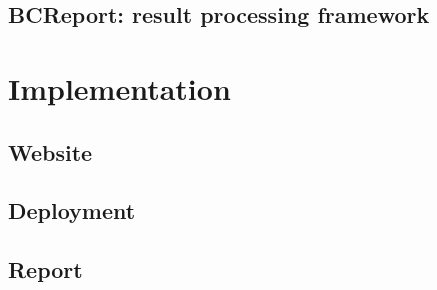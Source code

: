 \subsection{BCReport: result processing framework}



\section{Implementation}

\subsection{Website}

\subsection{Deployment}

\subsection{Report}
